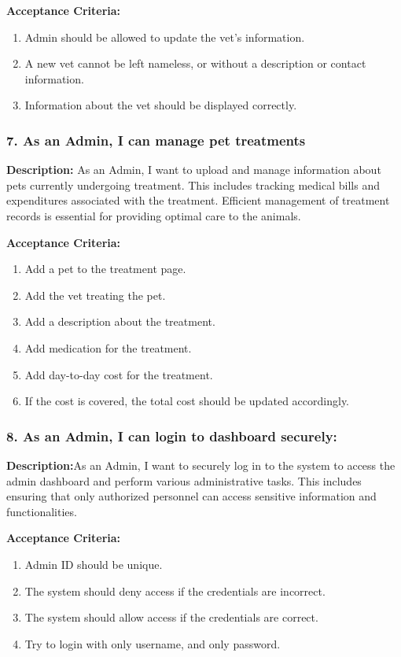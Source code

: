 \textbf{Acceptance Criteria:}
\begin{enumerate}
    \item Admin should be allowed to update the vet's information.
    \item A new vet cannot be left nameless, or without a description or contact information.
    \item Information about the vet should be displayed correctly.
\end{enumerate}

\subsubsection*{7. As an Admin, I can manage pet treatments}
\textbf{Description:} As an Admin, I want to upload and manage information about pets currently undergoing treatment. This includes tracking medical bills and expenditures associated with the treatment. Efficient management of treatment records is essential for providing optimal care to the animals.

\textbf{Acceptance Criteria:}
\begin{enumerate}
    \item Add a pet to the treatment page.
    \item Add the vet treating the pet.
    \item Add a description about the treatment.
    \item Add medication for the treatment.
    \item Add day-to-day cost for the treatment.
    \item If the cost is covered, the total cost should be updated accordingly.
\end{enumerate}

\subsubsection*{8. As an Admin, I can login to dashboard securely:}
\textbf{Description:}As an Admin, I want to securely log in to the system to access the admin dashboard and perform various administrative tasks. This includes ensuring that only authorized personnel can access sensitive information and functionalities.

\textbf{Acceptance Criteria:}
\begin{enumerate}
    \item Admin ID should be unique.
    \item The system should deny access if the credentials are incorrect.
    \item The system should allow access if the credentials are correct.
    \item Try to login with only username, and only password.
\end{enumerate}

